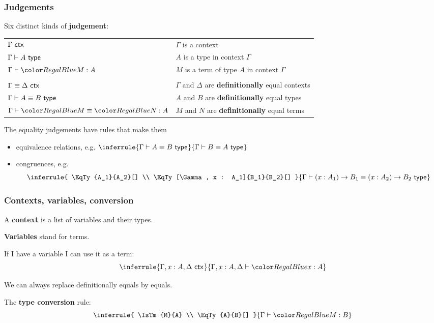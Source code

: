\documentclass{beamer} %
\begin{document}
\begin{frame}
  \frametitle{Judgements}
  
  Six distinct kinds of \textbf{judgement}:
  \begin{center}
    \begin{tabular}{ll}
      $\Gamma\ \mathsf{ctx}_{}$    & $\Gamma$ is a context \\
      $\IsTy{A}[]$        & $A$ is a type in context $\Gamma$ \\
      $\IsTm{M}{A}$       & $M$ is a \alert{term} of type $A$ in context $\Gamma$ \\
      & \\
      $\Gamma \equiv \Delta\ \mathsf{ctx}_{}$  & $\Gamma$ and $\Delta$ are \textbf{definitionally} equal contexts \\
      $\EqTy{A}{B}[]$             & $A$ and $B$ are \textbf{definitionally} equal types \\
      $\EqTm{M}{N}{A}$          & $M$ and $N$ are \textbf{definitionally} equal terms
    \end{tabular}
  \end{center}
  The equality judgements have rules that make them
  \begin{itemize}
    \item equivalence relations, e.g. $
        \inferrule{
          \EqTy{A}{B}[]
        }{
          \EqTy{B}{A}[]
        }
    $
    \item congruences, e.g. \[
      \inferrule{
        \EqTy{A_1}{A_2}[] \\
        \EqTy[\Gamma, x : A_1]{B_1}{B_2}[]
      }{
        \EqTy{\Fn{x}{A_1}{B_1}}{\Fn{x}{A_2}{B_2}}[]
      }
    \]
  \end{itemize}
\end{frame}

\begin{frame}
  \frametitle{Contexts, variables, conversion}
  A \textbf{context} is a list of variables and their types.
  
  \medskip

  \textbf{Variables} stand for terms.

  If I have a variable I can use it as a term:
  \[
    \inferrule{
      \IsCtx{\Gamma, x : A, \Delta}
    }{
      \IsTm[\Gamma, x : A, \Delta]{x}{A}
    }
  \]
  
  \medskip
  
  We can always replace definitionally equals by equals. 

  The \textbf{type conversion} rule:
  \[
    \inferrule{
      \IsTm{M}{A} \\
      \EqTy{A}{B}[]
    }{
      \IsTm{M}{B}
    }
  \]

\end{frame}
\end{document}
